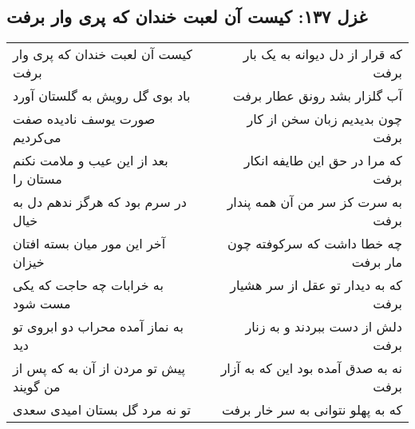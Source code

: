 \begin{center}
\section*{غزل ۱۳۷: کیست آن لعبت خندان که پری وار برفت}
\label{sec:137}
\begin{longtable}{l p{0.5cm} r}
کیست آن لعبت خندان که پری وار برفت
&&
که قرار از دل دیوانه به یک بار برفت
\\
باد بوی گل رویش به گلستان آورد
&&
آب گلزار بشد رونق عطار برفت
\\
صورت یوسف نادیده صفت می‌کردیم
&&
چون بدیدیم زبان سخن از کار برفت
\\
بعد از این عیب و ملامت نکنم مستان را
&&
که مرا در حق این طایفه انکار برفت
\\
در سرم بود که هرگز ندهم دل به خیال
&&
به سرت کز سر من آن همه پندار برفت
\\
آخر این مور میان بسته افتان خیزان
&&
چه خطا داشت که سرکوفته چون مار برفت
\\
به خرابات چه حاجت که یکی مست شود
&&
که به دیدار تو عقل از سر هشیار برفت
\\
به نماز آمده محراب دو ابروی تو دید
&&
دلش از دست ببردند و به زنار برفت
\\
پیش تو مردن از آن به که پس از من گویند
&&
نه به صدق آمده بود این که به آزار برفت
\\
تو نه مرد گل بستان امیدی سعدی
&&
که به پهلو نتوانی به سر خار برفت
\\
\end{longtable}
\end{center}
